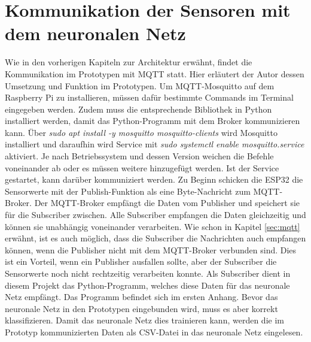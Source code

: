 \section{Kommunikation der Sensoren mit dem neuronalen Netz}
\label{sec:komm}
Wie in den vorherigen Kapiteln zur Architektur erwähnt, findet die Kommunikation im Prototypen mit MQTT statt. Hier erläutert der Autor dessen Umsetzung und Funktion im Prototypen.
\newline
Um MQTT-Mosquitto auf dem Raspberry Pi zu installieren, müssen dafür bestimmte Commands im Terminal eingegeben werden. Zudem muss die entsprechende Bibliothek in Python installiert werden, damit das Python-Programm mit dem Broker kommunizieren kann. Über 
\newline
\newline
\emph{sudo apt install -y mosquitto mosquitto-clients}
\newline
\newline
wird Mosquitto installiert und daraufhin wird Service mit 
\newline
\newline
\emph{sudo systemctl enable mosquitto.service} aktiviert.
\newline
\newline
Je nach Betriebssystem und dessen Version weichen die Befehle voneinander ab oder es müssen weitere hinzugefügt werden. 
\newline
Ist der Service gestartet, kann darüber kommuniziert werden. Zu Beginn schicken die ESP32 die Sensorwerte mit der Publish-Funktion als eine Byte-Nachricht zum MQTT-Broker. Der MQTT-Broker empfängt die Daten vom Publisher und speichert sie für die Subscriber zwischen. Alle Subscriber empfangen die Daten gleichzeitig und können sie unabhängig voneinander verarbeiten. Wie schon in Kapitel \ref{sec:mqtt} erwähnt, ist es auch möglich, dass die Subscriber die Nachrichten auch empfangen können, wenn die Publisher nicht mit dem MQTT-Broker verbunden sind. Dies ist ein Vorteil, wenn ein Publisher ausfallen sollte, aber der Subscriber die Sensorwerte noch nicht rechtzeitig verarbeiten konnte. Als Subscriber dient in diesem Projekt das Python-Programm, welches diese Daten für das neuronale Netz empfängt. Das Programm befindet sich im ersten Anhang. Bevor das neuronale Netz in den Prototypen eingebunden wird, muss es aber korrekt klassifizieren. Damit das neuronale Netz dies trainieren kann, werden die im Prototyp kommunizierten Daten als CSV-Datei in das neuronale Netz eingelesen. 
\newline
